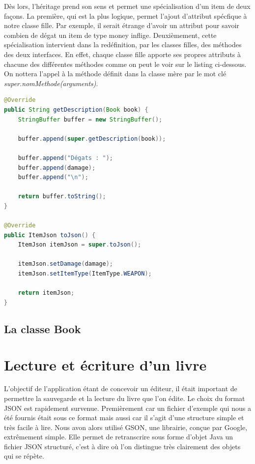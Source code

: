 			Dès lors, l'héritage prend son sens et permet une spécialisation d'un item de deux façons. La première, qui est la plus logique, permet l'ajout d'attribut spécfique à notre classe fille. Par exemple, il serait étrange d'avoir un attribut pour savoir combien de dégat un item de type money inflige. Deuxièmement, cette spécialisation intervient dans la redéfinition, par les classes filles, des méthodes des deux interfaces. En effet, chaque classe fille apporte ses propres attributs à chacune des différentes méthodes comme on peut le voir sur le listing ci-dessous. On nottera l'appel à la méthode définit dans la classe mère par le mot clé \textit{super.nomMethode(arguments)}.

\begin{lstlisting}[language=Java, caption=Exemple de spécialisation des items]
@Override
public String getDescription(Book book) {
	StringBuffer buffer = new StringBuffer();

	buffer.append(super.getDescription(book));

	buffer.append("Dégats : ");
	buffer.append(damage);
	buffer.append("\n");

	return buffer.toString();
}

@Override
public ItemJson toJson() {
	ItemJson itemJson = super.toJson();

	itemJson.setDamage(damage);
	itemJson.setItemType(ItemType.WEAPON);

	return itemJson;
}
\end{lstlisting}

		\subsection{La classe Book}



	\section{Lecture et écriture d'un livre}

		L'objectif de l'application étant de concevoir un éditeur, il était important de permettre la sauvegarde et la lecture du livre que l'on édite. Le choix du format JSON est rapidement survenue. Premièrement car un fichier d'exemple qui nous a été fournis était sous ce format mais aussi car il s'agit d'une structure simple et très facile à lire. Nous avon alors utilisé GSON, une librairie, conçue par Google, extrêmement simple. Elle permet de retranscrire sous forme d'objet Java un fichier JSON structuré, c'est à dire où l'on distingue très clairement des objets qui se répète.

